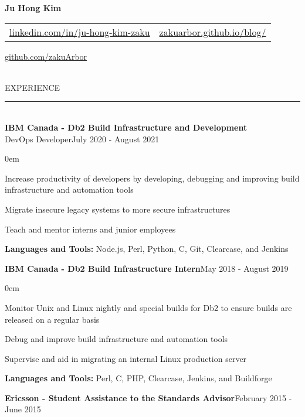\documentclass[10pt]{report}
\newcommand\myshade{85}
\begin{document}
\centerline{\textbf{\Large{Ju Hong Kim}}}
\hypersetup{urlcolor   = myurlcolor!\myshade!black}

\begin{center}
    \begin{tabular}{ r | l }
        \href{https://linkedin.com/in/ju-hong-kim-zaku}{linkedin.com/in/ju-hong-kim-zaku} & \href{https://zakuarbor.github.io/blog/}{zakuarbor.github.io/blog/}
    \end{tabular}
\end{center}
\vspace*{-\baselineskip}
\centerline{\href{https://github.com/zakuArbor}{github.com/zakuArbor}}
\hfill\\
\large{EXPERIENCE}
\vspace{4pt}
\hrule
\hfill\\
\normalsize{\textbf{IBM Canada - Db2 Build Infrastructure and Development}}\\
DevOps Developer\hfill July 2020 - August 2021
\begin{itemize}[leftmargin=*]
\itemsep0em 
\small{
    \item Increase productivity of developers by developing, debugging and improving build infrastructure and automation tools
    \item Migrate insecure legacy systems to more secure infrastructures
    \item Teach and mentor interns and junior employees
    \item \textbf{Languages and Tools:} Node.js, Perl, Python, C, Git, Clearcase, and Jenkins
}
\end{itemize}
\vspace{10pt}
\normalsize{\textbf{IBM Canada - Db2 Build Infrastructure Intern}}\hfill May 2018 - August 2019
\begin{itemize}[leftmargin=*]
\itemsep0em 
\small{
    \item Monitor Unix and Linux nightly and special builds for Db2 to ensure builds are released on a regular basis
    \item Debug and improve build infrastructure and automation tools
    \item Supervise and aid in migrating an internal Linux production server
    \item \textbf{Languages and Tools:} Perl, C, PHP, Clearcase, Jenkins, and Buildforge
}
\end{itemize}
\vspace{10pt}
\normalsize{\textbf{Ericsson - Student Assistance to the Standards Advisor}}\hfill February 2015 - June 2015
\end{document}
